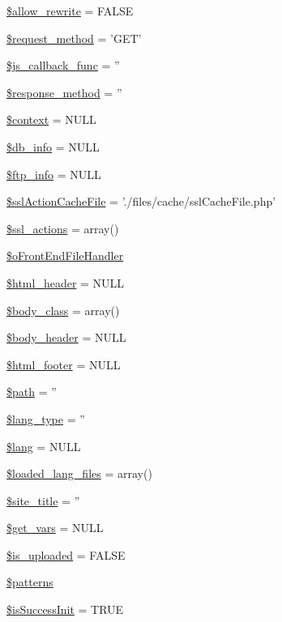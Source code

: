 \begin{DoxyCompactItemize}
\item 
\hyperlink{classContext_a24355a0c151bd3285c45254f773af275}{\$allow\+\_\+rewrite} = F\+A\+L\+S\+E
\item 
\hyperlink{classContext_a1e80f487f65708456eb17be0024aee50}{\$request\+\_\+method} = 'G\+E\+T'
\item 
\hyperlink{classContext_afddd5e6374a20b88466dfd1cb6f32d62}{\$js\+\_\+callback\+\_\+func} = ''
\item 
\hyperlink{classContext_a383836fb81ee24d673c7145e4d2eb030}{\$response\+\_\+method} = ''
\item 
\hyperlink{classContext_a39e9103dacbca5e5fa49d6e93f0ccec3}{\$context} = N\+U\+L\+L
\item 
\hyperlink{classContext_a6f4d307bdcb4bfd83fda27bc265977eb}{\$db\+\_\+info} = N\+U\+L\+L
\item 
\hyperlink{classContext_a8b9cb334c451f773d75db73b01f86ccc}{\$ftp\+\_\+info} = N\+U\+L\+L
\item 
\hyperlink{classContext_a5554b6376a0703ebfbdf2bf79800bfee}{\$ssl\+Action\+Cache\+File} = './files/cache/ssl\+Cache\+File.\+php'
\item 
\hyperlink{classContext_a9f8d33aa42d3851da1134d3ba2fbf009}{\$ssl\+\_\+actions} = array()
\item 
\hyperlink{classContext_a55e855769152e53af5e2ecb9b889c7f6}{\$o\+Front\+End\+File\+Handler}
\item 
\hyperlink{classContext_ab0146079ffcc658bbe5bbf4ba7b8e934}{\$html\+\_\+header} = N\+U\+L\+L
\item 
\hyperlink{classContext_af0bb833a3157d6d2153d7858cb60e435}{\$body\+\_\+class} = array()
\item 
\hyperlink{classContext_aa2c90f49a1f6389eadea8962d0fbf5b3}{\$body\+\_\+header} = N\+U\+L\+L
\item 
\hyperlink{classContext_ad55e79b648659c59512e02a6c0d349ff}{\$html\+\_\+footer} = N\+U\+L\+L
\item 
\hyperlink{classContext_a0752e74e1ec01a4fd63c044a1d3bd28b}{\$path} = ''
\item 
\hyperlink{classContext_a170ac1b95c16b53af329395df9376e9f}{\$lang\+\_\+type} = ''
\item 
\hyperlink{classContext_a0771720dad655d0c53f6f31066c67a40}{\$lang} = N\+U\+L\+L
\item 
\hyperlink{classContext_a0a199fec60b92b21746f1b6e93df01dc}{\$loaded\+\_\+lang\+\_\+files} = array()
\item 
\hyperlink{classContext_a3663ad0bbcb194dbb5766db96c9ecefb}{\$site\+\_\+title} = ''
\item 
\hyperlink{classContext_a587652913f4784dc8ad4a1cd4e3ee408}{\$get\+\_\+vars} = N\+U\+L\+L
\item 
\hyperlink{classContext_a4f8c544baae73ab83d08ec55e0c7c00d}{\$is\+\_\+uploaded} = F\+A\+L\+S\+E
\item 
\hyperlink{classContext_a257fa15929338411949a173ff34ab35d}{\$patterns}
\item 
\hyperlink{classContext_a342fb7b74268197dea5cadbe62aaea7a}{\$is\+Success\+Init} = T\+R\+U\+E
\end{DoxyCompactItemize}


